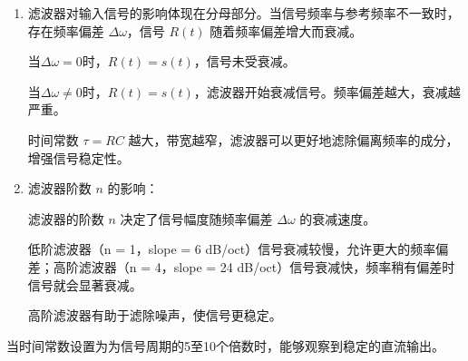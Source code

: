 \documentclass[dvipsnames, svgnames,a4paper,11pt]{article}
\begin{document}
		\begin{enumerate}
			\item 滤波器对输入信号的影响体现在分母部分。当信号频率与参考频率不一致时，存在频率偏差 \( \Delta\omega \)，信号 \( R(t) \) 随着频率偏差增大而衰减。

			当$\Delta\omega = 0$时，$R(t) = s(t)$，信号未受衰减。

			当$\Delta\omega \neq 0$时，$R(t) = s(t)$，滤波器开始衰减信号。频率偏差越大，衰减越严重。


			时间常数 \( \tau = RC \) 越大，带宽越窄，滤波器可以更好地滤除偏离频率的成分，增强信号稳定性。

			\item 滤波器阶数 \( n \) 的影响：

			滤波器的阶数 \( n \) 决定了信号幅度随频率偏差 \( \Delta\omega \) 的衰减速度。

			低阶滤波器（n = 1，slope = 6 dB/oct）信号衰减较慢，允许更大的频率偏差；高阶滤波器（n = 4，slope = 24 dB/oct）信号衰减快，频率稍有偏差时信号就会显著衰减。


			高阶滤波器有助于滤除噪声，使信号更稳定。





		\end{enumerate}

		当时间常数设置为为信号周期的5至10个倍数时，能够观察到稳定的直流输出。

		


\end{document}
